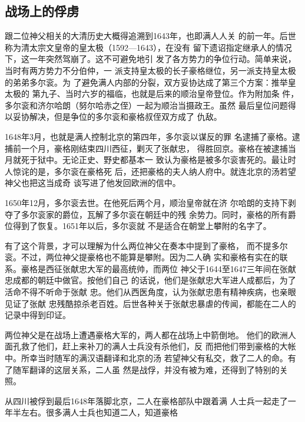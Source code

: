 \subsection{战场上的俘虏}
\par
跟二位神父相关的大清历史大概得追溯到1643年，也即满人人关%
的前一年。后世称为清太宗文皇帝的皇太极（1592—1643），在没有%
留下遗诏指定继承人的情况下，这一年突然驾崩了。这不可避免地引%
发了各方势力的争位行动。简单来说，当时有两方势力不分伯仲，一%
派支持皇太极的长子豪格继位，另一派支持皇太极的弟弟多尔衮。为%
了避免满人内部的分裂，双方妥协达成了第三个方案：推举皇太极的%
第九子、当时六岁的福临，也就是后来的顺治皇帝登位。作为附加条%
件，多尔衮和济尔哈朗（努尔哈赤之侄）一起为顺治当摄政王。虽然%
最后皇位问题得以妥协解决，但是争位的多尔衮和豪格叔侄双方成了%
仇敌。%
\par
1648年3月，也就是满人控制北京的第四年，多尔衮以谋反的罪%
名逮捕了豪格。逮捕前一个月，豪格刚结束四川西征，剿灭了张献忠，%
得胜回京。豪格在被逮捕当月就死于狱中。无论正史、野史都基本一%
致认为豪格是被多尔衮害死的。最让时人惊诧的是，多尔衮在豪格死%
后，还把豪格的夫人纳人府中。就连北京的汤若望神父也把这当成奇%
谈写进了他发回欧洲的信中。%
\par
1650年12月，多尔衮去世。在他死后两个月，顺治皇帝就在济%
尔哈朗的支持下剥夺了多尔衮家的爵位，瓦解了多尔衮在朝廷中的残%
余势力。同时，豪格的所有爵位得到了恢复。1651年以后，多尔衮就%
不是适合在朝堂上攀附的名字了。%
\par
有了这个背景，才可以理解为什么两位神父在奏本中提到了豪格，%
而不提多尔衮。不过，两位神父提豪格也不能算是攀附。因为二人确%
实和豪格有实在的联系。豪格是西征张献忠大军的最高统帅，而两位%
神父于1644至1647三年间在张献忠成都的朝廷中做官。按他们自己%
的话说，他们是张献忠大军进人成都后，为了活命不得不听命于张献%
忠。他们从西医角度，认为张献忠患有精神疾病，也亲眼见证了张献%
忠残酷掠杀老百姓。后世各种关于张献忠暴虐的传闻，都能在二人的%
记录中得到印证。%
\par
两位神父是在战场上遭遇豪格大军的，两人都在战场上中箭倒地。%
他们的欧洲人面孔救了他们，赶上来补刀的满人士兵没有杀他们，反%
而把他们带到豪格的大帐中。所幸当时随军的满汉语翻译和北京的汤%
若望神父有私交，救了二人的命。有了随军翻译的这层关系，二人虽%
然是战俘，并没有被为难，还得到了特别的关照。%
\par
从四川被俘到最后1648年落脚北京，二人在豪格部队中跟着满%
人士兵一起走了一年半左右。很多满人士兵也知道二人，知道豪格%

